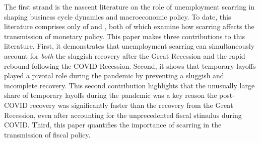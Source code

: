
The first strand is the nascent literature on the role of unemployment scarring in shaping business cycle dynamics and macroeconomic policy. To date, this literature comprises only of \cite{AlvesViolante2023} and \cite{AlvesViolante2024}, both of which examine how scarring affects the transmission of monetary policy. This paper makes three contributions to this literature. First, it demonstrates that unemployment scarring can simultaneously account for \textit{both} the sluggish recovery after the Great Recession and the rapid rebound following the COVID Recession. Second, it shows that temporary layoffs played a pivotal role during the pandemic by preventing a sluggish and incomplete recovery. This second contribution highlights that the unusually large share of temporary layoffs during the pandemic was a key reason the post-COVID recovery was significantly faster than the recovery from the Great Recession, even after accounting for the unprecedented fiscal stimulus during COVID. Third, this paper quantifies the importance of scarring in the transmission of fiscal policy.

